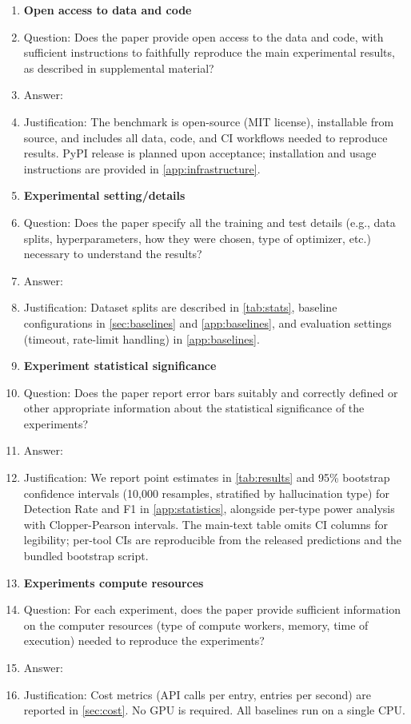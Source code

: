 \begin{enumerate}
\item {\bf Open access to data and code}
    \item[] Question: Does the paper provide open access to the data and code, with sufficient instructions to faithfully reproduce the main experimental results, as described in supplemental material?
    \item[] Answer: \answerYes{}
    \item[] Justification: The benchmark is open-source (MIT license), installable from source, and includes all data, code, and CI workflows needed to reproduce results. PyPI release is planned upon acceptance; installation and usage instructions are provided in \cref{app:infrastructure}.

\item {\bf Experimental setting/details}
    \item[] Question: Does the paper specify all the training and test details (e.g., data splits, hyperparameters, how they were chosen, type of optimizer, etc.) necessary to understand the results?
    \item[] Answer: \answerYes{}
    \item[] Justification: Dataset splits are described in \cref{tab:stats}, baseline configurations in \cref{sec:baselines} and \cref{app:baselines}, and evaluation settings (timeout, rate-limit handling) in \cref{app:baselines}.

\item {\bf Experiment statistical significance}
    \item[] Question: Does the paper report error bars suitably and correctly defined or other appropriate information about the statistical significance of the experiments?
    \item[] Answer: \answerYes{}
    \item[] Justification: We report point estimates in \cref{tab:results} and 95\% bootstrap confidence intervals (10{,}000 resamples, stratified by hallucination type) for Detection Rate and F1 in \cref{app:statistics}, alongside per-type power analysis with Clopper-Pearson intervals. The main-text table omits CI columns for legibility; per-tool CIs are reproducible from the released predictions and the bundled bootstrap script.

\item {\bf Experiments compute resources}
    \item[] Question: For each experiment, does the paper provide sufficient information on the computer resources (type of compute workers, memory, time of execution) needed to reproduce the experiments?
    \item[] Answer: \answerYes{}
    \item[] Justification: Cost metrics (API calls per entry, entries per second) are reported in \cref{sec:cost}. No GPU is required. All baselines run on a single CPU.


\end{enumerate}
